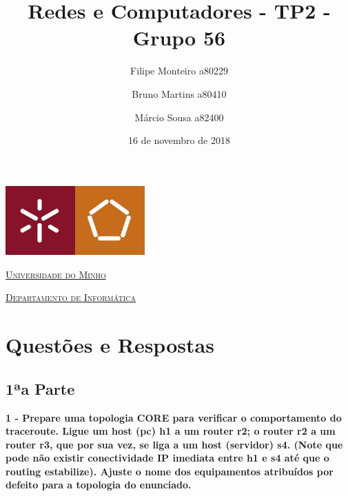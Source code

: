 \documentclass[a4paper]{article}
\date{16 de novembro de 2018}
\title{Redes e Computadores - TP2 - Grupo 56}
\author{Filipe Monteiro a80229 \and Bruno Martins a80410 \and Márcio Sousa a82400}
\begin{document}
\begin{titlepage}
 
  \thispagestyle{empty}
  \begin{center}
  \begin{minipage}{0.75\linewidth}
      \centering
      \includegraphics[width=0.4\textwidth]{eng.jpeg}\par\vspace{1cm}
      \vspace{1.5cm}
      \href{https://www.uminho.pt/PT}{\scshape\LARGE Universidade do Minho} \par
      \vspace{1cm}
      \href{https://www.di.uminho.pt/}{\scshape\Large Departamento de Informática} \par
      \vspace{1.5cm}
 
  \maketitle
  \end{minipage}
  \end{center}
  \tableofcontents
 
 \end{titlepage}





\newpage
\section{Questões e Respostas}

\subsection{1ªa Parte}

\textbf{1 - Prepare uma topologia CORE para verificar o comportamento	do traceroute.\newline	
Ligue um host (pc) h1 a	um router r2; o	router r2 a	um	router r3, que por sua	vez, se liga a um host (servidor) s4. (Note que pode não existir conectividade IP imediata	entre h1 e s4 até que o routing estabilize). Ajuste o nome dos equipamentos atribuídos	por defeito	para a topologia do enunciado.}\newline
\vspace{1cm}
\end{document}
